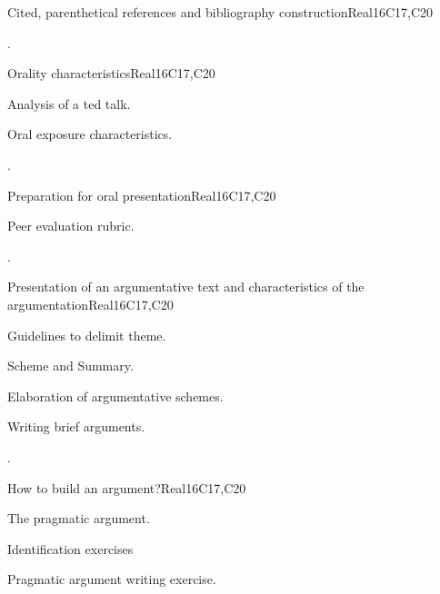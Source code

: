 \begin{syllabus}
\begin{unit}{Cited, parenthetical references and bibliography construction}{}{Real}{16}{C17,C20}
  \begin{learningoutcomes}
   \item .%
  \end{learningoutcomes}
\end{unit}

\begin{unit}{Orality characteristics}{}{Real}{16}{C17,C20}
  \begin{topics}
      \item Analysis of a ted talk.
      \item Oral exposure characteristics.
  \end{topics}

  \begin{learningoutcomes}
   \item .%
  \end{learningoutcomes}
\end{unit}

\begin{unit}{Preparation for oral presentation}{}{Real}{16}{C17,C20}
  \begin{topics}
      \item Peer evaluation rubric.
  \end{topics}

  \begin{learningoutcomes}
   \item .%
  \end{learningoutcomes}
\end{unit}


\begin{unit}{Presentation of an argumentative text and characteristics of the argumentation}{}{Real}{16}{C17,C20}
  \begin{topics}
      \item Guidelines to delimit theme.
      \item Scheme and Summary.
      \item Elaboration of argumentative schemes.
      \item Writing brief arguments.
  \end{topics}

  \begin{learningoutcomes}
   \item .%
  \end{learningoutcomes}
\end{unit}

\begin{unit}{How to build an argument?}{}{Real}{16}{C17,C20}
  \begin{topics}
      \item The pragmatic argument.
      \item Identification exercises
      \item Pragmatic argument writing exercise.
  \end{topics}


\end{unit}
\end{syllabus}

